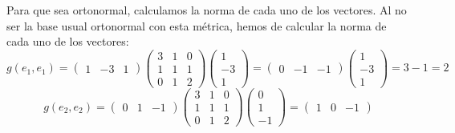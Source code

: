 \documentclass[12pt]{article}
\begin{document}
\begin{ejercicio} 
\begin{enumerate}
        Para que sea ortonormal, calculamos la norma de cada uno de los vectores. Al no ser la base usual ortonormal con esta métrica, hemos de calcular la norma de cada uno de los vectores:
        \begin{equation*}
            g(e_1, e_1) = \left(\begin{array}{ccc}
                    1&-3&1
                \end{array}\right)
                \left(\begin{array}{ccc}
                    3 & 1 & 0 \\
                    1 & 1 & 1 \\
                    0 & 1 & 2
                \end{array}\right)
                \left(\begin{array}{c}
                    1\\-3\\1
                \end{array}\right)
                =
                \left(\begin{array}{ccc}
                    0&-1&-1
                \end{array}\right)
                \left(\begin{array}{c}
                    1\\-3\\1
                \end{array}\right) = 3-1=2
        \end{equation*}
        \begin{equation*}
            g(e_2, e_2) = \left(\begin{array}{ccc}
                    0&1&-1
                \end{array}\right)
                \left(\begin{array}{ccc}
                    3 & 1 & 0 \\
                    1 & 1 & 1 \\
                    0 & 1 & 2
                \end{array}\right)
                \left(\begin{array}{c}
                    0\\1\\-1
                \end{array}\right)
                =
                \left(\begin{array}{ccc}
                    1 & 0 & -1
                \end{array}\right)

\end{equation*}
\end{enumerate}
\end{ejercicio}
\end{document}
